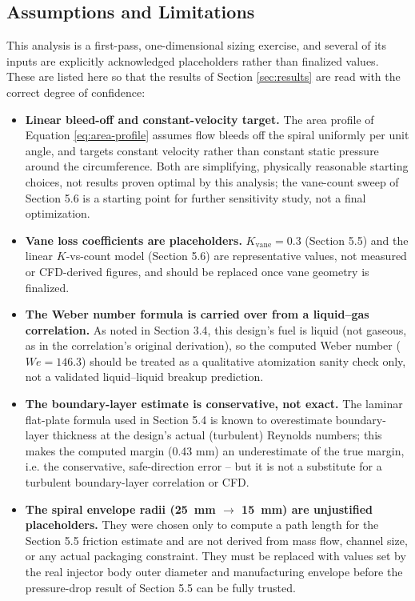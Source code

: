 \documentclass[11pt,a4paper]{article}
\begin{document}
\subsection{Assumptions and Limitations}
\label{sec:limitations}

This analysis is a first-pass, one-dimensional sizing exercise, and several of its inputs are explicitly acknowledged placeholders rather than finalized values. These are listed here so that the results of Section \ref{sec:results} are read with the correct degree of confidence:

\begin{itemize}[leftmargin=1.5em]
\item \textbf{Linear bleed-off and constant-velocity target.} The area profile of Equation \ref{eq:area-profile} assumes flow bleeds off the spiral uniformly per unit angle, and targets constant velocity rather than constant static pressure around the circumference. Both are simplifying, physically reasonable starting choices, not results proven optimal by this analysis; the vane-count sweep of Section 5.6 is a starting point for further sensitivity study, not a final optimization.
\item \textbf{Vane loss coefficients are placeholders.} $K_{\text{vane}} = 0.3$ (Section 5.5) and the linear $K$-vs-count model (Section 5.6) are representative values, not measured or CFD-derived figures, and should be replaced once vane geometry is finalized.
\item \textbf{The Weber number formula is carried over from a liquid--gas correlation.} As noted in Section 3.4, this design's fuel is liquid (not gaseous, as in the correlation's original derivation), so the computed Weber number ($We = 146.3$) should be treated as a qualitative atomization sanity check only, not a validated liquid--liquid breakup prediction.
\item \textbf{The boundary-layer estimate is conservative, not exact.} The laminar flat-plate formula used in Section 5.4 is known to overestimate boundary-layer thickness at the design's actual (turbulent) Reynolds numbers; this makes the computed margin (0.43 mm) an underestimate of the true margin, i.e. the conservative, safe-direction error -- but it is not a substitute for a turbulent boundary-layer correlation or CFD.
\item \textbf{The spiral envelope radii (25~mm $\to$ 15~mm) are unjustified placeholders.} They were chosen only to compute a path length for the Section 5.5 friction estimate and are not derived from mass flow, channel size, or any actual packaging constraint. They must be replaced with values set by the real injector body outer diameter and manufacturing envelope before the pressure-drop result of Section 5.5 can be fully trusted.

\end{itemize}
\end{document}
